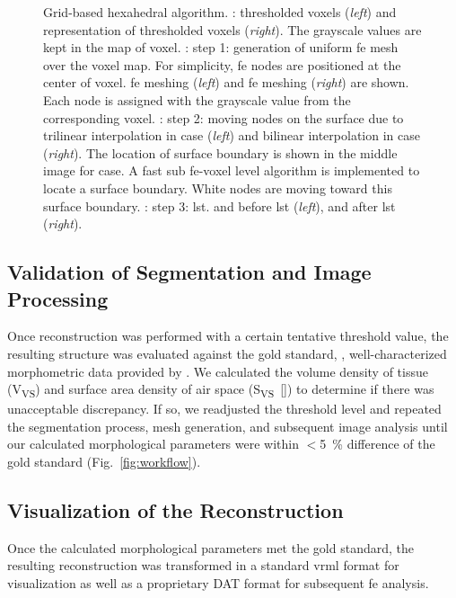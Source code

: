 \begin{figure}
{		\label{subfig:tsuda-04d}%
	}%
	\caption[Grid-based hexahedral algorithm]{Grid-based hexahedral algorithm. : \threed thresholded voxels (\textit{left}) and \twod representation of thresholded voxels (\textit{right}). The grayscale values are kept in the map of voxel. : step 1: generation of uniform \acl{fe} mesh over the voxel map. For simplicity, \ac{fe} nodes are positioned at the center of voxel. \threed \ac{fe} meshing (\textit{left}) and \twod \ac{fe} meshing (\textit{right}) are shown. Each node is assigned with the grayscale value from the corresponding voxel. : step 2: moving nodes on the surface due to trilinear interpolation in \threed case (\textit{left}) and bilinear interpolation in \twod case (\textit{right}). The location of surface boundary is shown in the middle image for \twod case. A fast sub \ac{fe}-voxel level algorithm is implemented to locate a surface boundary. White nodes are moving toward this surface boundary. : step 3: \acf{lst}. \threed and \twod before \ac{lst} (\textit{left}), \threed and \twod after \ac{lst} (\textit{right}).}
	\label{fig:tsuda-04}
\end{figure}

\subsection[Validation of Segmentation]{Validation of Segmentation and Image Processing}
Once \threed reconstruction was performed with a certain tentative threshold value, the resulting \threed structure was evaluated against the gold standard, \ie, well-characterized morphometric data provided by \citet{Tschanz2003}. We calculated the volume density of tissue (V\textsubscript{VS}) and surface area density of air space (S\textsubscript{VS}~[\centimetresquared\per\centimetrecubed]) to determine if there was unacceptable discrepancy. If so, we readjusted the threshold level and repeated the segmentation process, mesh generation, and subsequent image analysis until our calculated morphological parameters were within $<$\SI{5}{\percent} difference of the gold standard (Fig.~\ref{fig:workflow}).

\subsection[Visualization of the Reconstruction]{Visualization of the \threed Reconstruction}
Once the calculated morphological parameters met the gold standard, the resulting \threed reconstruction was transformed in a standard \acs{vrml} format for visualization as well as a proprietary DAT format for subsequent \ac{fe} analysis.

